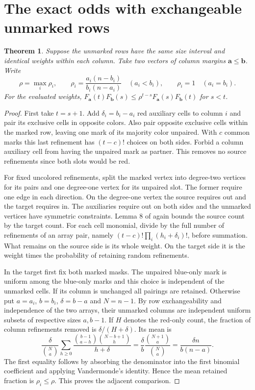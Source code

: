 \documentclass[11pt]{article}
\newtheorem{theorem}{Theorem}
\begin{document}
\section{The exact odds with exchangeable unmarked rows}
\begin{theorem}\label{th:odds}
Suppose the unmarked rows have the same size interval and identical weights within each column. Take two vectors of column margins $\boldsymbol a\le\boldsymbol b$. Write
\[
\rho=\max_i\rho_i,\qquad
\rho_i=\frac{a_i(n-b_i)}{b_i(n-a_i)}\quad (a_i<b_i),\qquad \rho_i=1\quad(a_i=b_i).
\]
For the evaluated weights, $F_{\boldsymbol a}(t)F_{\boldsymbol b}(s)\le
\rho^{t-s}F_{\boldsymbol a}(s)F_{\boldsymbol b}(t)$ for $s<t$.
\end{theorem}

\begin{proof}
First take $t=s+1$. Add $\delta_i=b_i-a_i$ red auxiliary cells to column $i$ and pair its exclusive cells in opposite colors. Also pair opposite exclusive cells within the marked row, leaving one mark of its majority color unpaired. With $c$ common marks this last refinement has $(t-c)!$ choices on both sides. Forbid a column auxiliary cell from having the unpaired mark as partner. This removes no source refinements since both slots would be red.

For fixed uncolored refinements, split the marked vertex into degree-two vertices for its pairs and one degree-one vertex for its unpaired slot. The former require one edge in each direction. On the degree-one vertex the source requires out and the target requires in. The auxiliaries require out on both sides and the unmarked vertices have symmetric constraints. Lemma 8 of \cite{kn} again bounds the source count by the target count. For each cell monomial, divide by the full number of refinements of an array pair, namely $(t-c)!\prod_i(h_i+\delta_i)!$, before summation. What remains on the source side is its whole weight. On the target side it is the weight times the probability of retaining random refinements.

In the target first fix both marked masks. The unpaired blue-only mark is uniform among the blue-only marks and this choice is independent of the unmarked cells. If its column is unchanged all pairings are retained. Otherwise put $a=a_i$, $b=b_i$, $\delta=b-a$ and $N=n-1$. By row exchangeability and independence of the two arrays, their unmarked columns are independent uniform subsets of respective sizes $a,b-1$. If $H$ denotes the red-only count, the fraction of column refinements removed is $\delta/(H+\delta)$. Its mean is
\[
 \frac{\delta}{\binom Na}\sum_{h\ge0}
 \frac{\binom{b-1}{a-h}\binom{N-b+1}{h}}{h+\delta}
 =\frac{\delta}{b}\frac{\binom{N+1}{a}}{\binom Na}
 =\frac{\delta n}{b(n-a)}.
\]
The first equality follows by absorbing the denominator into the first binomial coefficient and applying Vandermonde's identity. Hence the mean retained fraction is $\rho_i\le\rho$. This proves the adjacent comparison.


\end{proof}
\end{document}
